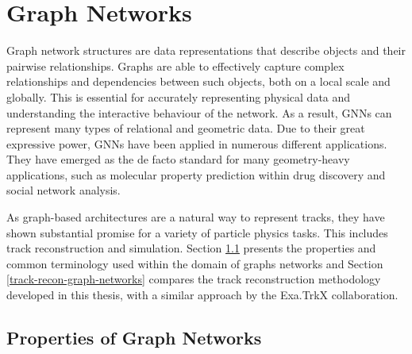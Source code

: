 

\section{Graph Networks}
\label{graph-networks}

Graph network structures are data representations that describe objects and their pairwise relationships. Graphs are able to effectively capture complex relationships and dependencies between such objects, both on a local scale and globally. This is essential for accurately representing physical data and understanding the interactive behaviour of the network. As a result, GNNs can represent many types of relational and geometric data. Due to their great expressive power, GNNs have been applied in numerous different applications. They have emerged as the de facto standard for many geometry-heavy applications, such as molecular property prediction within drug discovery and social network analysis.

As graph-based architectures are a natural way to represent tracks, they have shown substantial promise for a variety of particle physics tasks. This includes track reconstruction and simulation. Section \ref{properties-graph-networks} presents the properties and common terminology used within the domain of graphs networks and Section \ref{track-recon-graph-networks} compares the track reconstruction methodology developed in this thesis, with a similar approach by the Exa.TrkX collaboration.




\subsection{Properties of Graph Networks}
\label{properties-graph-networks}

